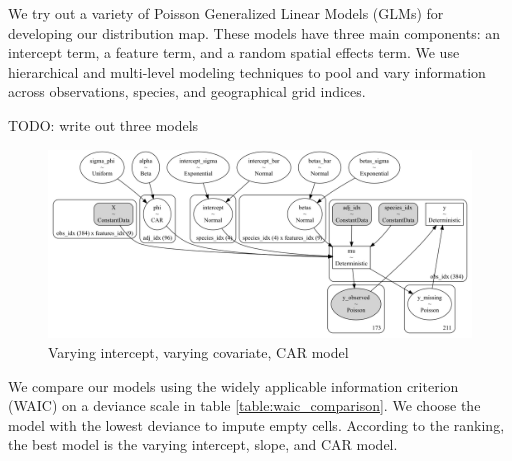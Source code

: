 \documentclass[notitlepage]{article}
\begin{document}
We try out a variety of Poisson Generalized Linear Models (GLMs) for developing our distribution map.
These models have three main components: an intercept term, a feature term, and a random spatial effects term.
We use hierarchical and multi-level modeling techniques to pool and vary information across observations, species, and geographical grid indices.

TODO: write out three models

\begin{figure}[H]
\centering
\includegraphics[width=\textwidth]{report/figures/full_model.png}
\caption{Varying intercept, varying covariate, CAR model}
\end{figure}

We compare our models using the widely applicable information criterion (WAIC) on a deviance scale in table \ref{table:waic_comparison}.
We choose the model with the lowest deviance to impute empty cells.
According to the ranking, the best model is the varying intercept, slope, and CAR model.
\end{document}
